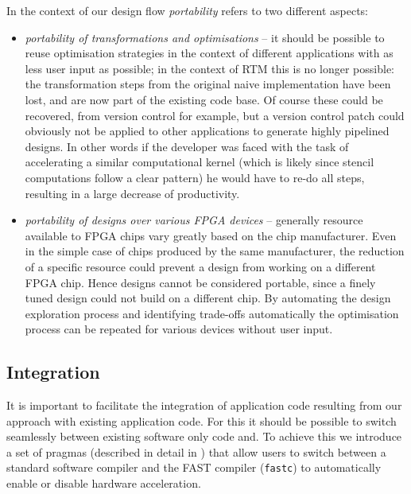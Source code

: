 In the context of our design flow \emph{portability} refers to two
different aspects:
\begin{itemize}
\item \emph{portability of transformations and optimisations} -- it
  should be possible to reuse optimisation strategies in the context
  of different applications with as less user input as possible; in
  the context of RTM this is no longer possible: the transformation
  steps from the original naive implementation have been lost, and are
  now part of the existing code base. Of course these could be
  recovered, from version control for example, but a version control
  patch could obviously not be applied to other applications to
  generate highly pipelined designs. In other words if the developer
  was faced with the task of accelerating a similar computational
  kernel (which is likely since stencil computations follow a clear
  pattern) he would have to re-do all steps, resulting in a large
  decrease of productivity.

\item \emph{portability of designs over various FPGA devices} --
  generally resource available to FPGA chips vary greatly based on the
  chip manufacturer. Even in the simple case of chips produced by the
  same manufacturer, the reduction of a specific resource could
  prevent a design from working on a different FPGA chip. Hence
  designs cannot be considered portable, since a finely tuned design
  could not build on a different chip. By automating the design
  exploration process and identifying trade-offs automatically the
  optimisation process can be repeated for various devices without
  user input.
\end{itemize}


\subsection{Integration}

It is important to facilitate the integration of application code
resulting from our approach with existing application code. For this
it should be possible to switch seamlessly between existing software
only code and. To achieve this we introduce a set of pragmas
(described in detail in \Cref{}) that allow users to switch between a
standard software compiler and the FAST compiler (\texttt{fastc}) to
automatically enable or disable hardware acceleration.

